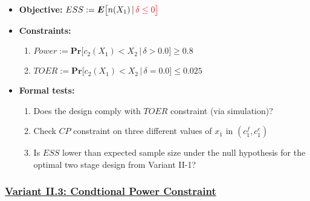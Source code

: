 \documentclass[]{book}
\providecommand{\tightlist}{%
  \setlength{\itemsep}{0pt}\setlength{\parskip}{0pt}}
\begin{document}
\begin{itemize}
\tightlist
\item
  \textbf{Objective:} \(ESS := \boldsymbol{E}\big[n(X_1)\,|\,\color{red}{\delta\leq 0}\big]\)
\item
  \textbf{Constraints:}

  \begin{enumerate}
  \def\labelenumi{\arabic{enumi}.}
  \tightlist
  \item
    \(Power := \boldsymbol{Pr}\big[c_2(X_1) < X_2\,|\,\delta> 0.0\big] \geq 0.8\)
  \item
    \(TOER := \boldsymbol{Pr}\big[c_2(X_1) < X_2\,|\,\delta=0.0\big] \leq 0.025\)
  \end{enumerate}
\item
  \textbf{Formal tests:}

  \begin{enumerate}
  \def\labelenumi{\arabic{enumi}.}
  \tightlist
  \item
    Does the design comply with \(TOER\) constraint (via simulation)?
  \item
    Check \(CP\) constraint on three different values of \(x_1\) in
    \((c_1^f, c_1^e)\)
  \item
    Is \(ESS\) lower than expected sample size under the null hypothesis
    for the optimal two stage design from Variant II-1?
  \end{enumerate}
\end{itemize}

\hypertarget{variant-ii.3-condtional-power-constraint}{%
\subsubsection{\texorpdfstring{\protect\hyperlink{variantII_3}{Variant II.3: Condtional Power Constraint}}{Variant II.3: Condtional Power Constraint}}\label{variant-ii.3-condtional-power-constraint}}
\end{document}
